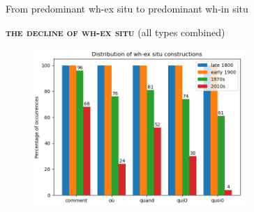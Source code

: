 \documentclass[lesson_slides]{subfiles}
\begin{document}
\begin{frame}[c]{From predominant wh-ex situ to predominant wh-in situ}

    \textbf{\textsc{the decline of wh-ex situ}} (all types combined)
    \begin{center}
        \includegraphics[width=10cm, height=6cm]{images/exsitu5.png}
    \end{center}
  
\end{frame}
\end{document}
